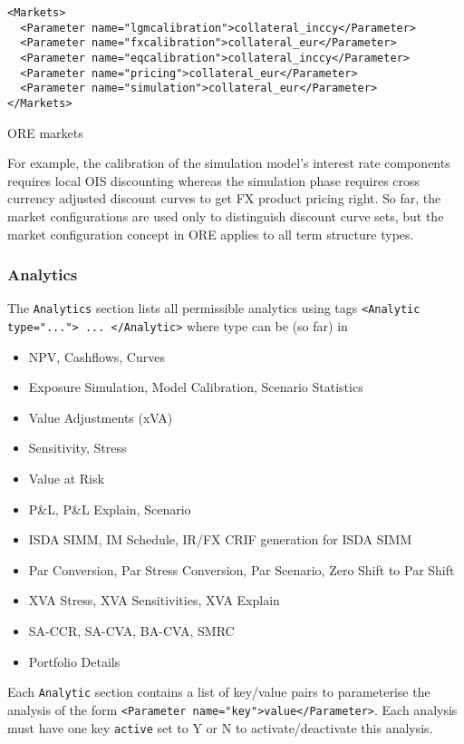 {\begin{listing}[H]
\begin{verbatim}
<Markets>
  <Parameter name="lgmcalibration">collateral_inccy</Parameter>
  <Parameter name="fxcalibration">collateral_eur</Parameter>
  <Parameter name="eqcalibration">collateral_inccy</Parameter>
  <Parameter name="pricing">collateral_eur</Parameter>
  <Parameter name="simulation">collateral_eur</Parameter>
</Markets>
\end{verbatim}
\caption{ORE markets}
\label{lst:ore_markets}
\end{listing}

For example, the calibration of the simulation model's interest rate components requires local OIS discounting whereas
the simulation phase requires cross currency adjusted discount curves to get FX product pricing right. So far, the
market configurations are used only to distinguish discount curve sets, but the market configuration concept in ORE
applies to all term structure types.

\subsubsection*{Analytics}\label{sec:analytics}

The {\tt Analytics} section lists all permissible analytics using tags {\tt <Analytic type="..."> ... </Analytic>} where
type can be (so far) in
\begin{itemize}
\item NPV, Cashflows, Curves
\item Exposure Simulation, Model Calibration, Scenario Statistics
\item Value Adjustments (xVA)
\item Sensitivity, Stress
\item Value at Risk
\item P\&L, P\&L Explain, Scenario
\item ISDA SIMM, IM Schedule, IR/FX CRIF generation for ISDA SIMM
\item Par Conversion, Par Stress Conversion, Par Scenario, Zero Shift to Par Shift
\item XVA Stress, XVA Sensitivities, XVA Explain
\item SA-CCR, SA-CVA, BA-CVA, SMRC
\item Portfolio Details
\end{itemize}

Each {\tt Analytic} section contains a list of key/value pairs to parameterise the analysis of the form {\tt <Parameter
  name="key">value</Parameter>}. Each analysis must have one key {\tt active} set to Y or N to activate/deactivate this
analysis.

}

